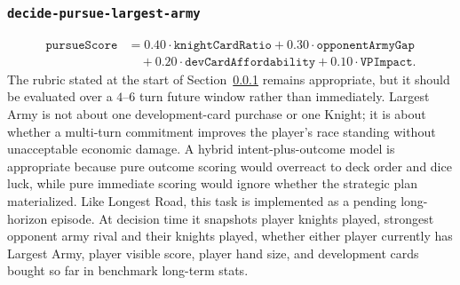 \documentclass{article}
\begin{document}
\subsubsection{\texttt{decide-pursue-largest-army}}
\label{app:task-decide-pursue-largest-army}
\[
\begin{aligned}
\texttt{pursueScore}
&= 0.40 \cdot \texttt{knightCardRatio}
+ 0.30 \cdot \texttt{opponentArmyGap} \\
&\quad + 0.20 \cdot \texttt{devCardAffordability}
+ 0.10 \cdot \texttt{VPImpact}.
\end{aligned}
\]
The rubric stated at the start of Section~\ref{app:task-decide-pursue-largest-army} remains appropriate, but it should be evaluated over a $4$--$6$ turn future window rather than immediately. Largest Army is not about one development-card purchase or one Knight; it is about whether a multi-turn commitment improves the player's race standing without unacceptable economic damage. A hybrid intent-plus-outcome model is appropriate because pure outcome scoring would overreact to deck order and dice luck, while pure immediate scoring would ignore whether the strategic plan materialized.
Like Longest Road, this task is implemented as a pending long-horizon episode. At decision time it snapshots player knights played, strongest opponent army rival and their knights played, whether either player currently has Largest Army, player visible score, player hand size, and development cards bought so far in benchmark long-term stats.
\end{document}
